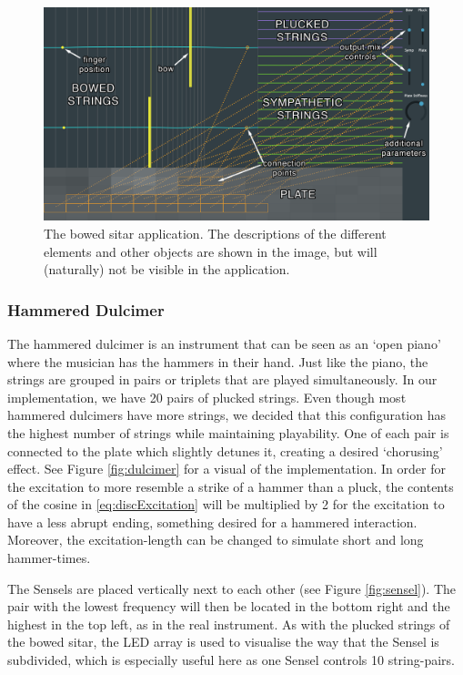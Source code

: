\begin{figure}[h]
\centering
\includegraphics[width=\paperFigWidth\textwidth]{figures/BowedSitar.png}
\caption{The bowed sitar application. The descriptions of the different elements and other objects are shown in the image, but will (naturally) not be visible in the application. \label{fig:bowedSitar}}
\end{figure}

\subsubsection{Hammered Dulcimer}
The hammered dulcimer is an instrument that can be seen as an `open piano' where the musician has the hammers in their hand. Just like the piano, the strings are grouped in pairs or triplets
that are played simultaneously. 
In our implementation, we have 20 pairs of plucked strings. Even though most hammered dulcimers have more strings, we decided that this configuration has the highest number of strings while maintaining playability. One of each pair is connected to the plate which slightly detunes it, creating a desired `chorusing' effect. See Figure \ref{fig:dulcimer} for a visual of the implementation. In order for the excitation to more resemble a strike of a hammer than a pluck, the contents of the cosine in \eqref{eq:discExcitation} will be multiplied by 2 for the excitation to have a less abrupt ending, something desired for a hammered interaction. Moreover, the excitation-length can be changed to simulate short and long hammer-times.

The Sensels are placed vertically next to each other (see Figure \ref{fig:sensel}). The pair with the lowest frequency will then be located in the bottom right and the highest in the top left, as in the real instrument. As with the plucked strings of the bowed sitar, the LED array is used to visualise the way that the Sensel is subdivided, which is especially useful here as one Sensel controls 10 string-pairs. 

